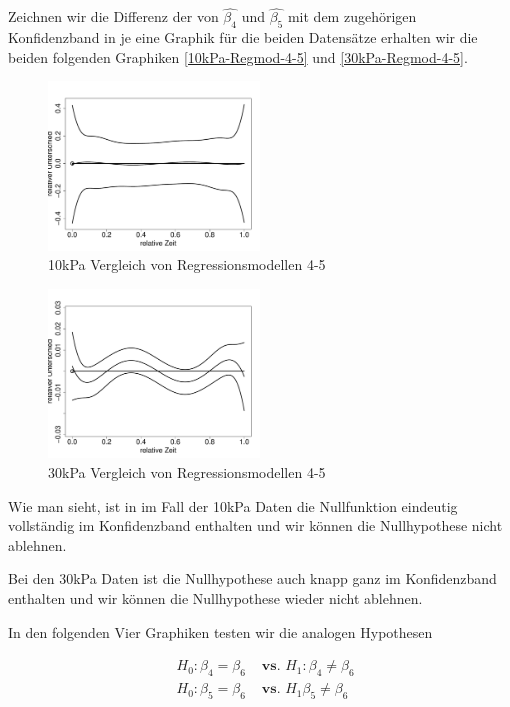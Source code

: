 \documentclass[12pt,a4paper]{article}
\theoremstyle{definition}
\theoremstyle{definition}
\theoremstyle{definition}
\theoremstyle{definition}
\begin{document}
Zeichnen wir die Differenz der von $\hat{\beta_4}$ und $\hat{\beta_5}$ mit dem zugehörigen Konfidenzband in je eine Graphik für die beiden Datensätze erhalten wir die beiden folgenden Graphiken \eqref{10kPa-Regmod-4-5} und \eqref{30kPa-Regmod-4-5}.

\begin{figure}[H] 
  \centering
     \includegraphics[width=0.5\textwidth]{10kPa-poly-KB-4-5.pdf}
  \caption{10kPa Vergleich von Regressionsmodellen 4-5}
  \label{10kPa-Regmod-4-5}
\end{figure}

\begin{figure}[H] 
  \centering
     \includegraphics[width=0.5\textwidth]{30kPa-poly-KB-4-5.pdf}
  \caption{30kPa Vergleich von Regressionsmodellen 4-5}
  \label{30kPa-Regmod-4-5}
\end{figure}

Wie man sieht, ist in im Fall der 10kPa Daten die Nullfunktion eindeutig vollständig im Konfidenzband enthalten und wir können die Nullhypothese nicht ablehnen.

Bei den 30kPa Daten ist die Nullhypothese auch knapp ganz im Konfidenzband enthalten und wir können die Nullhypothese wieder nicht ablehnen.

In den folgenden Vier Graphiken testen wir die analogen Hypothesen

\begin{eqnarray*}
& H_0 : \beta_4 = \beta_6 & \textbf{ vs. } H_1 : \beta_4 \neq \beta_6 \\
& H_0 : \beta_5 = \beta_6 & \textbf{ vs. } H_1 \beta_5 \neq \beta_6
\end{eqnarray*} 
\end{document}
